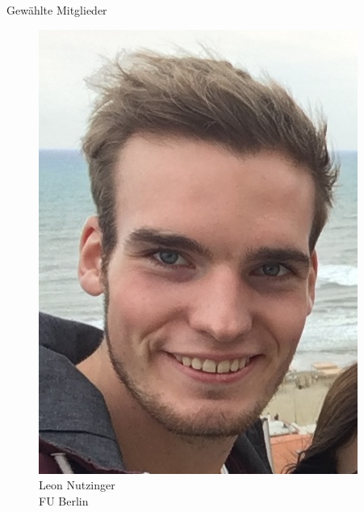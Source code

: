\documentclass[compress, aspectratio=169]{beamer}
\begin{document}
\begin{frame}{Gewählte Mitglieder}
\begin{minipage}{.32\textwidth}
\begin{figure}
\begin{minipage}[c]{.57\textwidth}
        \includegraphics[width=\textwidth]{chris.jpeg}
      \end{minipage} \hfill
      \begin{minipage}[c]{.4\textwidth}
        \caption*{Leon Nutzinger \\FU Berlin}
      \end{minipage}
    \end{figure}
  \end{minipage}


\end{frame}
\end{document}
